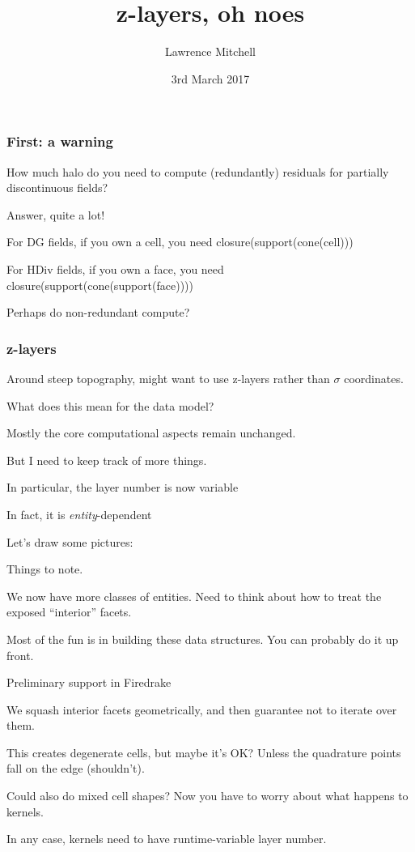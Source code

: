 \documentclass[presentation]{beamer}
\date{3rd March 2017}
\author{Lawrence Mitchell\inst{1}}
\institute{\inst{1}Departments of Computing and Mathematics, Imperial College London}
\title{z-layers, oh noes}
\begin{document}
\begin{frame}
  \frametitle{First: a warning}

  How much halo do you need to compute (redundantly) residuals for
  partially discontinuous fields?

  Answer, quite a lot!

  For DG fields, if you own a cell, you need closure(support(cone(cell)))

  For HDiv fields, if you own a face, you need
  closure(support(cone(support(face))))

  Perhaps do non-redundant compute?
\end{frame}

\begin{frame}
  \frametitle{z-layers}

  Around steep topography, might want to use z-layers rather than
  $\sigma$ coordinates.

  What does this mean for the data model?

  Mostly the core computational aspects remain unchanged.

  But I need to keep track of more things.

  In particular, the layer number is now variable

  In fact, it is \emph{entity}-dependent
\end{frame}

\begin{frame}
  Let's draw some pictures:

  Things to note.

  We now have more classes of entities.  Need to think about how to
  treat the exposed ``interior'' facets.

  Most of the fun is in building these data structures.  You can
  probably do it up front.
\end{frame}

\begin{frame}
  Preliminary support in Firedrake

  We squash interior facets geometrically, and then guarantee not to
  iterate over them.

  This creates degenerate cells, but maybe it's OK?  Unless the
  quadrature points fall on the edge (shouldn't).

  Could also do mixed cell shapes?  Now you have to worry about what
  happens to kernels.

  In any case, kernels need to have runtime-variable layer number.
\end{frame}
\end{document}
